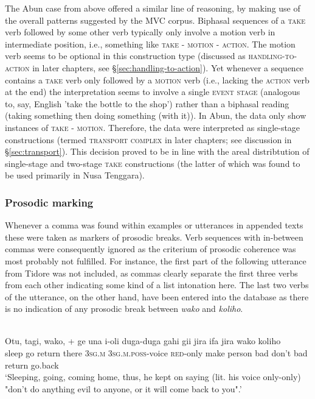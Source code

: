 The Abun case from above offered a similar line of reasoning, by making use of the overall patterns suggested by the MVC corpus. Biphasal sequences of a \textsc{take} verb followed by some other verb typically only involve a motion verb in intermediate position, i.e., something like \textsc{take} - \textsc{motion} - \textsc{action}. The motion verb seems to be optional in this construction type (discussed as \textsc{handling-to-action} in later chapters, see §\ref{sec:handling-to-action}). Yet whenever a sequence contains a \textsc{take} verb only followed by a \textsc{motion} verb (i.e., lacking the \textsc{action} verb at the end) the interpretation seems to involve a single \textsc{event stage} (analogous to, say, English 'take the bottle to the shop') rather than a biphasal reading (taking something then doing something (with it)). In Abun, the data only show instances of \textsc{take} - \textsc{motion}. Therefore, the data were interpreted as single-stage constructions (termed \textsc{transport complex} in later chapters; see discussion in §\ref{sec:transport}). This decision proved to be in line with the areal distribtution of single-stage and two-stage \textsc{take} constructions (the latter of which was found to be used primarily in Nusa Tenggara). 

\subsubsection{Prosodic marking}

Whenever a comma was found within examples or utterances in appended texts these were taken as markers of prosodic breaks. Verb sequences with in-between commas were consequently ignored as the criterium of prosodic coherence was most probably not fulfilled. For instance, the first part of the following utterance from Tidore was not included, as commas clearly separate the first three verbs from each other indicating some kind of a list intonation here. The last two verbs of the utterance, on the other hand, have been entered into the database as there is no indication of any prosodic break between \textit{wako} and \textit{koliho}.

\ea \label{}
\\
\gll Otu, tagi, wako, + ge una i-oli duga-duga gahi gii jira ifa jira wako koliho \\
sleep go return there 3\textsc{sg}.\textsc{m} 3\textsc{sg}.\textsc{m}.\textsc{poss}-voice \textsc{red}-only make person bad don't bad return go.back \\
\glft `Sleeping, going, coming home, thus, he kept on saying (lit. his voice only-only) "don’t
do anything evil to anyone, or it will come back to you".’\\ 
\z

